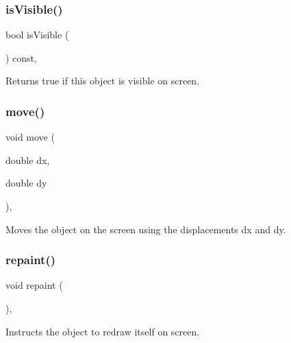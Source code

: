 \subsubsection{\texorpdfstring{is\+Visible()}{isVisible()}}
{\footnotesize\ttfamily bool is\+Visible (\begin{DoxyParamCaption}{ }\end{DoxyParamCaption}) const\hspace{0.3cm}{\ttfamily [virtual]}, {\ttfamily [inherited]}}



Returns {\ttfamily true} if this object is visible on screen. 

\mbox{\label{classsgl_1_1GObject_a5973d8dda83afb36e2c56855515be392}} 
\subsubsection{\texorpdfstring{move()}{move()}}
{\footnotesize\ttfamily void move (\begin{DoxyParamCaption}\item[{double}]{dx,  }\item[{double}]{dy }\end{DoxyParamCaption})\hspace{0.3cm}{\ttfamily [virtual]}, {\ttfamily [inherited]}}



Moves the object on the screen using the displacements {\ttfamily dx} and {\ttfamily dy}. 

\mbox{\label{classsgl_1_1GObject_ac827b978aa122f136a14c198687ad80f}} 
\subsubsection{\texorpdfstring{repaint()}{repaint()}}
{\footnotesize\ttfamily void repaint (\begin{DoxyParamCaption}{ }\end{DoxyParamCaption})\hspace{0.3cm}{\ttfamily [virtual]}, {\ttfamily [inherited]}}



Instructs the object to redraw itself on screen. 



